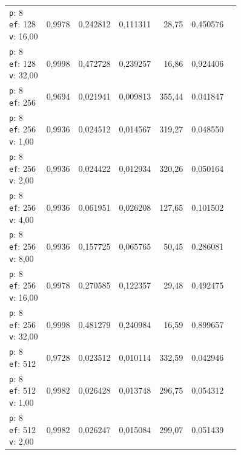 \begin{table}[htbp]
\begin{tabularx}{\textwidth}{Xrrrrrr}
    \makecell{\texttt{p}: 8\\\texttt{ef}: 128\\\texttt{v}: 16,00} & 0,9978 & 0,242812 & 0,111311 & 28,75 & 0,450576 \\
    \makecell{\texttt{p}: 8\\\texttt{ef}: 128\\\texttt{v}: 32,00} & 0,9998 & 0,472728 & 0,239257 & 16,86 & 0,924406 \\
    \makecell{\texttt{p}: 8\\\texttt{ef}: 256} & 0,9694 & 0,021941 & 0,009813 & 355,44 & 0,041847 \\
    \makecell{\texttt{p}: 8\\\texttt{ef}: 256\\\texttt{v}: 1,00} & 0,9936 & 0,024512 & 0,014567 & 319,27 & 0,048550 \\
    \makecell{\texttt{p}: 8\\\texttt{ef}: 256\\\texttt{v}: 2,00} & 0,9936 & 0,024422 & 0,012934 & 320,26 & 0,050164 \\
    \makecell{\texttt{p}: 8\\\texttt{ef}: 256\\\texttt{v}: 4,00} & 0,9936 & 0,061951 & 0,026208 & 127,65 & 0,101502 \\
    \makecell{\texttt{p}: 8\\\texttt{ef}: 256\\\texttt{v}: 8,00} & 0,9936 & 0,157725 & 0,065765 & 50,45 & 0,286081 \\
    \makecell{\texttt{p}: 8\\\texttt{ef}: 256\\\texttt{v}: 16,00} & 0,9978 & 0,270585 & 0,122357 & 29,48 & 0,492475 \\
    \makecell{\texttt{p}: 8\\\texttt{ef}: 256\\\texttt{v}: 32,00} & 0,9998 & 0,481279 & 0,240984 & 16,59 & 0,899657 \\
    \makecell{\texttt{p}: 8\\\texttt{ef}: 512} & 0,9728 & 0,023512 & 0,010114 & 332,59 & 0,042946 \\
    \makecell{\texttt{p}: 8\\\texttt{ef}: 512\\\texttt{v}: 1,00} & 0,9982 & 0,026428 & 0,013748 & 296,75 & 0,054312 \\
    \makecell{\texttt{p}: 8\\\texttt{ef}: 512\\\texttt{v}: 2,00} & 0,9982 & 0,026247 & 0,015084 & 299,07 & 0,051439 \\

\end{tabularx}
\end{table}
